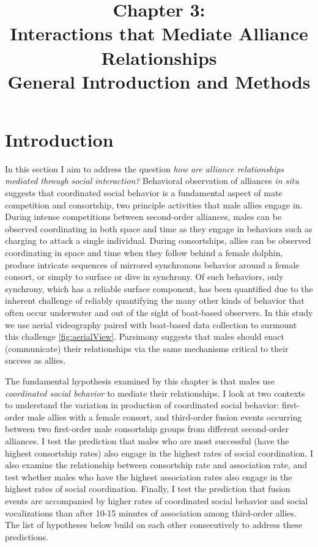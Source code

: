 \documentclass[11pt]{amsart}
\title{Chapter 3: \\ Interactions that Mediate Alliance Relationships \\ General Introduction and Methods}
\date{}
\begin{document}
\maketitle

\section{Introduction}

In this section I aim to address the question \emph{how are alliance relationships mediated through social interaction?} Behavioral observation of alliances \emph{in situ} suggests that coordinated social behavior is a fundamental aspect of mate competition and consortship, two principle activities that male allies engage in. During intense competitions between second-order alliances, males can be observed coordinating in both space and time as they engage in behaviors such as charging to attack a single individual. During consortships, allies can be observed coordinating in space and time when they follow behind a female dolphin, produce intricate sequences of mirrored synchronous behavior around a female consort, or simply to surface or dive in synchrony. Of such behaviors, only synchrony, which has a reliable surface component, has been quantified due to the inherent challenge of reliably quantifying the many other kinds of behavior that often occur underwater and out of the sight of boat-based observers. In this study we use aerial videography paired with boat-based data collection to surmount this challenge \ref{fig:aerialView}. Parsimony suggests that males should enact (communicate) their relationships via the same mechanisms critical to their success as allies. 

The fundamental hypothesis examined by this chapter is that males use \emph{coordinated social behavior} to mediate their relationships. I look at two contexts to understand the variation in production of coordinated social behavior: first-order male allies with a female consort, and third-order fusion events occurring between two first-order male consortship groups from different second-order alliances. I test the prediction that males who are most successful (have the highest consortship rates) also engage in the highest rates of social coordination. I also examine the relationship between consortship rate and association rate, and test whether males who have the highest association rates also engage in the highest rates of social coordination. Finally, I test the prediction that fusion events are accompanied by higher rates of coordinated social behavior and social vocalizations than after 10-15 minutes of association among third-order allies. The list of hypotheses below build on each other consecutively to address these predictions.
\end{document}

